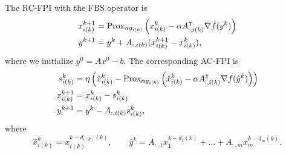 \documentclass[10pt,mathserif]{beamer}
\begin{document}
\begin{frame}[fragile]
The RC-FPI with the FBS operator is
\begin{align*}
  x^{k+1}_{i(k)} & = \mathrm{Prox}_{\alpha g_{i(k)}}\left( x^{k}_{i(k)} - \alpha A^\intercal_{:,i(k)}\nabla {f} (y^k)  \right)\\
  y^{k+1}&=y^k+A_{:,i(k)}(x^{k+1}_{i(k)}-x^{k}_{i(k)}),
\end{align*}
where we initialize $y^{0}=Ax^0-b$.
The corresponding AC-FPI is
\begin{align*}
  s^k_{i(k)}&=\eta\left(\hat{x}^k_{i(k)}-\mathrm{Prox}_{\alpha g_{i(k)}}\left( \hat{x}^{k}_{i(k)} - \alpha A^\intercal_{:,i(k)}\nabla {f} (\hat{y}^k)  \right)\right)\\
  x^{k+1}_{i(k)} & = x^k_{i(k)}-s^k_{i(k)}\\
  y^{k+1}&=y^k-A_{:,i(k)}s^k_{i(k)},
\end{align*}
where
\[
\hat{x}^{k}_{i(k)}=x^{k-d_{i(k)}(k)}_{i(k)},\qquad
\hat{y}^k=
A_{:,1}x^{k-d_{1}(k)}_{1}+\dots+A_{:,m}x^{k-d_{m}(k)}_{m}.
\]





\end{frame}
\end{document}
